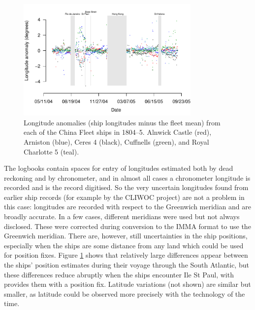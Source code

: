 \documentclass[CP]{copernicus}
\begin{document}
\begin{figure}[!hbp]
\begin{center}
\includegraphics[angle=0, width=0.8\textwidth]{./../../../analysis/south_pacific/figures/longitude_v_time}
\caption{Longitude anomalies (ship longitudes minus the fleet mean) from each of the China Fleet ships in 1804--5. Alnwick Castle (red), Arniston (blue), Ceres 4 (black), Cuffnells (green), and Royal Charlotte 5 (teal).}
\label{pf2}
\end{center}
\end{figure}
The logbooks contain spaces for entry of longitudes estimated both by dead reckoning and by chronometer, and in almost all cases a chronometer longitude is recorded and is the record digitised. So the very uncertain longitudes found from earlier ship records (for example by the CLIWOC project) are not a problem in this case: longitudes are recorded with respect to the Greenwich meridian and are broadly accurate. In a few cases, different meridians were used but not always disclosed. These were corrected during conversion to the IMMA format to use the Greenwich meridian. There are, however, still uncertainties in the ship positions, especially when the ships are some distance from any land which could be used for position fixes. Figure \ref{pf2} shows that relatively large differences appear between the ships' position estimates during their voyage through the South Atlantic, but these differences reduce abruptly when the ships encounter Ile St Paul, with provides them with a position fix. Latitude variations (not shown) are similar but smaller, as latitude could be observed more precisely with the technology of the time.
\end{document}
